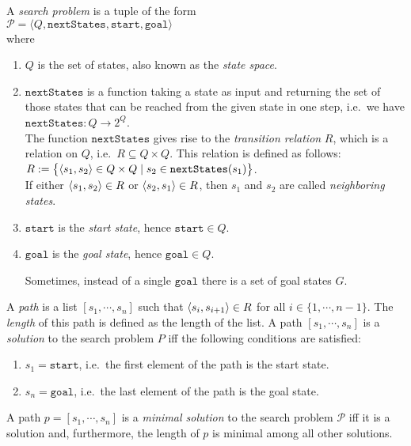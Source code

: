 \begin{Definition}
  A \emph{\color{blue}search problem} is a tuple of the form
  \\[0.2cm]
  \hspace*{1.3cm}
  $\mathcal{P} = \langle Q,\mathtt{nextStates}, \mathtt{start}, \mathtt{goal}\rangle$
  \\[0.2cm]
  where
  \begin{enumerate}
  \item $Q$ is the set of states, also known as the \emph{\color{blue}state space}.
  \item $\texttt{nextStates}$ is a function taking a state as input and returning the set of those
        states that can be reached from the given state in one step,
        i.e.~we have
        \\[0.2cm]
        \hspace*{1.3cm}
        $\texttt{nextStates}:Q \rightarrow 2^Q$.
        \\[0.2cm]
        The function $\mathtt{nextStates}$ gives rise to the \emph{\color{blue}transition relation} $R$, which is a
        relation on $Q$, i.e.~$R \subseteq Q \times Q$.  This relation is defined as follows:
        \\[0.2cm]
        \hspace*{1.3cm}
        $R := \bigl\{ \pair(s_1, s_2) \in Q \times Q \mid s_2 \in \mathtt{nextStates}(s_1) \bigr\}$.
        \\[0.2cm]
        If either $\pair(s_1, s_2) \in R$ or $\pair(s_2, s_1) \in R$, then  $s_1$ and $s_2$ are
        called \emph{\color{blue}neighboring states}.
  \item $\mathtt{start}$ is the \emph{\color{blue}start state}, hence $\mathtt{start} \in Q$. 
  \item $\mathtt{goal}$ is the \emph{\color{blue}goal state}, hence $\mathtt{goal} \in Q$.

        Sometimes, instead of a single $\mathtt{goal}$ there is a set of goal states $G$.
  \end{enumerate}
  A \emph{\color{blue}path} is a list $[s_1, \cdots, s_n]$ such that $\pair(s_i, s_{i+1}) \in R$ for all $i \in
  \{1,\cdots,n-1\}$. 
  The \emph{\color{blue}length} of this path is defined as the length of the list. 
  A path $[s_1, \cdots, s_n]$ is a \emph{\color{blue}solution} to the search problem $P$ iff the following
  conditions are satisfied:
  \begin{enumerate}
  \item $s_1 = \mathtt{start}$, i.e.~the first element of the path is the start state.
  \item $s_n = \mathtt{goal}$, i.e.~the last element of the path is the goal state. 
  \end{enumerate}
  A path $p = [s_1, \cdots, s_n]$ is a \emph{\color{blue}minimal solution} to the search problem $\mathcal{P}$ iff it is a
  solution and, furthermore, the length of $p$ is minimal among all other solutions. \eoxs
\end{Definition}

